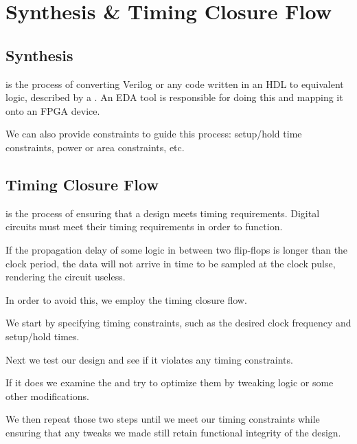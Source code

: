 \chapter{Synthesis \& Timing Closure Flow}

\section{Synthesis}

 is the process of converting Verilog or any code written in an HDL to equivalent logic, described by a . An EDA tool is responsible for doing this and mapping it onto an FPGA device. 
\begin{bullets}
	\item We can also provide constraints to guide this process: setup/hold time constraints, power or area constraints, etc.
\end{bullets}

\section{Timing Closure Flow}

 is the process of ensuring that a design meets timing requirements. Digital circuits must meet their timing requirements in order to function.
\begin{bullets}
	\item If the propagation delay of some logic in between two flip-flops is longer than the clock period, the data will not arrive in time to be sampled at the clock pulse, rendering the circuit useless.
\end{bullets}

In order to avoid this, we employ the timing closure flow.
\begin{bullets}
	\item We start by specifying timing constraints, such as the desired clock frequency and setup/hold times.
	\item Next we test our design and see if it violates any timing constraints.
	\item If it does we examine the  and try to optimize them by tweaking logic or some other modifications.
	\item We then repeat those two steps until we meet our timing constraints while ensuring that any tweaks we made still retain functional integrity of the design.
\end{bullets}